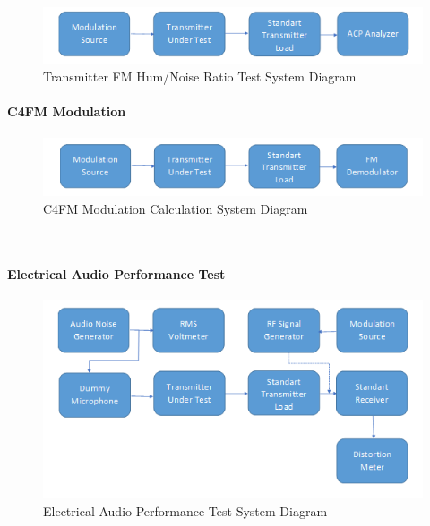 \begin{figure}[H]
	\center
	\setlength{\unitlength}{\textwidth} 
	\includegraphics[width=1.0\unitlength]{transnoise}
	\caption{\label{fig:transnoise}Transmitter FM Hum/Noise Ratio Test System Diagram }
\end{figure}


\paragraph{C4FM Modulation }
\- \indent

\begin{figure}[H]
	\center
	\setlength{\unitlength}{\textwidth} 
	\includegraphics[width=1.0\unitlength]{c4fmmod}
	\caption{\label{fig:c4fmmod}C4FM Modulation Calculation System Diagram }
\end{figure}

\- \\ \- \vfill

\paragraph{Electrical Audio Performance Test}
\- \indent


\begin{figure}[H]
	\center
	\setlength{\unitlength}{\textwidth} 
	\includegraphics[width=1.0\unitlength]{elecaudio}
	\caption{\label{fig:elecaudio}Electrical Audio Performance Test System Diagram }
\end{figure}

